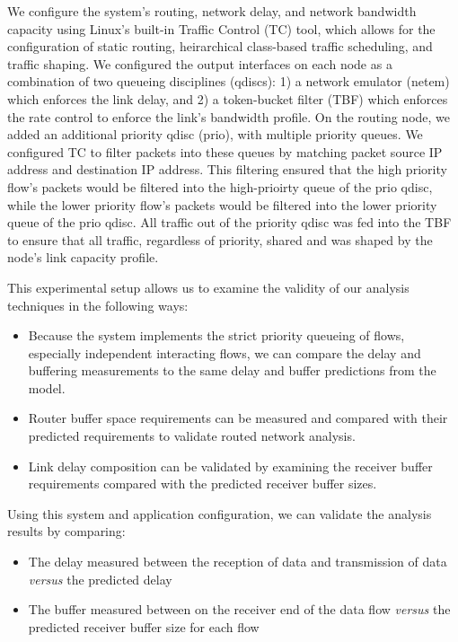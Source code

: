 We configure the system's routing, network delay, and network
bandwidth capacity using Linux's built-in Traffic Control
(TC)\cite{linux_tc} tool, which allows for the configuration of static
routing, heirarchical class-based traffic scheduling, and traffic
shaping.  We configured the output interfaces on each node as
a combination of two queueing disciplines (qdiscs): 1) a network
emulator (netem) which enforces the link delay, and 2) a token-bucket
filter (TBF) which enforces the rate control to enforce the link's
bandwidth profile.  On the routing node, we added an additional
priority qdisc (prio), with multiple priority queues.  We configured
TC to filter packets into these queues by matching packet source IP
address and destination IP address.  This filtering ensured that the
high priority flow's packets would be filtered into the high-prioirty
queue of the prio qdisc, while the lower priority flow's packets would
be filtered into the lower priority queue of the prio qdisc.  All
traffic out of the priority qdisc was fed into the TBF to ensure that
all traffic, regardless of priority, shared and was shaped by the
node's link capacity profile.  

This experimental setup allows us to examine the validity of our
analysis techniques in the following ways:

\begin{itemize}
  \item Because the system implements the strict priority queueing of
    flows, especially independent interacting flows, we can compare
    the delay and buffering measurements to the same delay and buffer
    predictions from the model.
  \item Router buffer space requirements can be measured and compared
    with their predicted requirements to validate routed network
    analysis.
  \item Link delay composition can be validated by examining the
    receiver buffer requirements compared with the predicted receiver
    buffer sizes.  
\end{itemize}

\iffalse
Using this system and application configuration, we can validate the
analysis results by comparing:

\begin{itemize}
  \item The delay measured between the reception of data and
    transmission of data \emph{versus} the predicted delay
  \item The buffer measured between on the receiver end of the data
    flow \emph{versus} the predicted receiver buffer size for each flow
\end{itemize}

